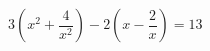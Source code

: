 \begin{ex}[type=equation]
	\begin{condition}
		 $3\left(x^2 +\dfrac{4}{x^2}\right) - 2 \left(x  - \dfrac{2}{x}\right) = 13$
	\end{condition}
\end{ex}